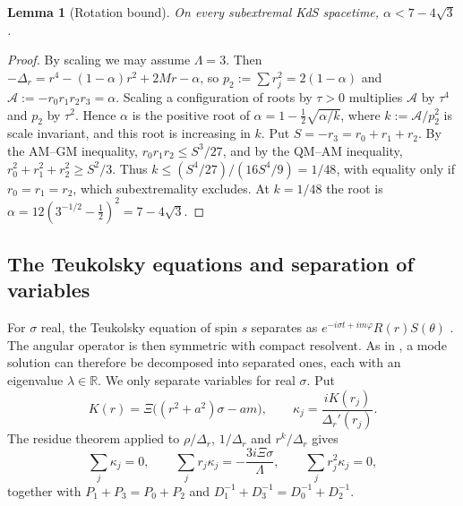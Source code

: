 \documentclass[11pt]{amsart}
\newtheorem{lemma}[theorem]{Lemma}
\theoremstyle{definition}
\theoremstyle{remark}
\numberwithin{equation}{section}
\newcommand{\R}{\mathbb{R}}
\begin{document}
\begin{lemma}[Rotation bound]\label{lem:alpha}
On every subextremal KdS spacetime, $\alpha<7-4\sqrt3$.
\end{lemma}
\begin{proof}
By scaling we may assume $\Lambda=3$. Then $-\Delta_r=r^4-(1-\alpha)r^2+2Mr-\alpha$, so $p_2:=\sum r_j^2=2(1-\alpha)$
and $\mathcal A:=-r_0r_1r_2r_3=\alpha$. Scaling a configuration of roots by $\tau>0$ multiplies $\mathcal A$ by $\tau^4$ and
$p_2$ by $\tau^2$. Hence $\alpha$ is the positive root of $\alpha=1-\frac12\sqrt{\alpha/k}$, where $k:=\mathcal A/p_2^2$
is scale invariant, and this root is increasing in $k$. Put $S=-r_3=r_0+r_1+r_2$. By the AM--GM inequality,
$r_0r_1r_2\le S^3/27$, and by the QM--AM inequality, $r_0^2+r_1^2+r_2^2\ge S^2/3$. Thus
$k\le(S^4/27)/(16S^4/9)=1/48$, with equality only if $r_0=r_1=r_2$, which subextremality excludes. At $k=1/48$ the
root is $\alpha=12(3^{-1/2}-\frac12)^2=7-4\sqrt3$.
\end{proof}

\subsection{The Teukolsky equations and separation of variables}
For $\sigma$ real, the Teukolsky equation of spin $s$ separates as $e^{-i\sigma t+im\varphi}R(r)S(\theta)$
\cite{Kha83}. The angular operator is then symmetric with compact resolvent. As in \cite[\S3]{Hin26}, a mode solution
can therefore be decomposed into separated ones, each with an eigenvalue $\lambda\in\R$. We only separate variables
for real $\sigma$. Put
\[
K(r)=\Xi\big((r^2+a^2)\sigma-am\big),\qquad \kappa_j=\frac{iK(r_j)}{\Delta_r'(r_j)}.
\]
The residue theorem applied to $\rho/\Delta_r$, $1/\Delta_r$ and $r^k/\Delta_r$ gives
\begin{equation}\label{eq:residues}
\sum_j\kappa_j=0,\qquad\sum_jr_j\kappa_j=-\frac{3i\Xi\sigma}{\Lambda},\qquad\sum_jr_j^2\kappa_j=0,
\end{equation}
together with $P_1+P_3=P_0+P_2$ and $D_1^{-1}+D_3^{-1}=D_0^{-1}+D_2^{-1}$.
\end{document}
